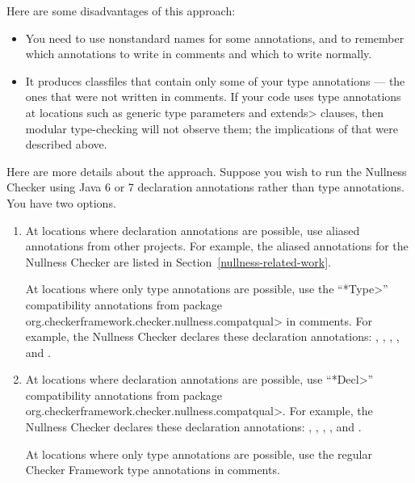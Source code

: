 Here are some disadvantages of this approach:

\begin{itemize}
\item
  You need to use nonstandard names for
  some annotations, and to remember which annotations to write in comments
  and which to write normally.
\item
  It produces classfiles that contain only some of your type annotations
  --- the ones that were not written in comments.
  If your code uses type annotations at 
  locations such as generic type parameters and \<extends> clauses, then
  modular type-checking will not observe them;
  the implications of that were described above.
\end{itemize}


Here are more details about the approach.
Suppose you wish to run the Nullness Checker using Java 6 or 7
declaration annotations rather than type annotations.  You have two options.

\begin{enumerate}
\item
At locations where declaration annotations are possible,
use aliased annotations from other projects.  For example, the aliased
annotations for the Nullness Checker are listed in
Section~\ref{nullness-related-work}.

At locations where only type annotations are possible, use the
``\<*Type>'' compatibility annotations from package
\<org.checkerframework.checker.nullness.compatqual>
in comments.  For example, the Nullness Checker
declares these declaration annotations:
,
,
,
, and
.

\item
At locations where declaration annotations are possible,
use ``\<*Decl>'' compatibility annotations from package
\<org.checkerframework.checker.nullness.compatqual>.
For example, the Nullness Checker
declares these declaration annotations:
,
,
,
, and
.

At locations where only type annotations are possible, use the regular
Checker Framework type annotations in comments.
\end{enumerate}

